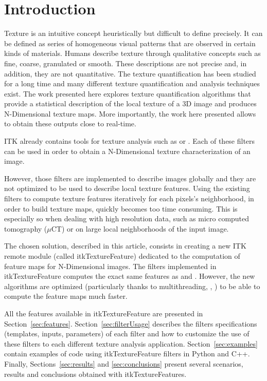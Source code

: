 \documentclass{InsightArticle}
\newcommand{\IJhandlerIDnumber}{3574}
\begin{document}
\IJhandlenote{\IJhandlerIDnumber}
\newpage
\tableofcontents
\newpage
\section{Introduction}
\label{sec:intro}

Texture is an intuitive concept heuristically but difficult to define
precisely. It can be defined as series of homogeneous visual patterns that are
observed in certain kinds of materials. Humans describe texture through
qualitative concepts such as fine, coarse, granulated or smooth. These
descriptions are not precise and, in addition, they are not quantitative. The
texture quantification has been studied for a long time and many different texture quantification and analysis techniques exist. The work presented here explores texture quantification algorithms that provide a statistical description of the local texture of a 3D image and produces N-Dimensional texture maps. More importantly, the work here presented allows to obtain these outputs close to real-time.

ITK already contains tools for texture analysis such as
 or
. Each of these filters can be
used in order to obtain a N-Dimensional texture characterization of an image.

However, those filters are implemented to describe images globally and they
are not optimized to be used to describe local texture features. Using the
existing filters to compute texture features iteratively for each pixels's
neighborhood, in order to build texture maps, quickly becomes too time
consuming. This is especially so when dealing with high resolution data, such
as micro computed tomography ($\mu$CT) or on large local neighborhoods of the input image.

The chosen solution, described in this article, consists in creating a new ITK
remote module (called itkTextureFeature) dedicated to the computation of feature maps
for N-Dimensional images. The filters implemented in itkTextureFeature
computes the exact same features as  and . However, the new algorithms are optimized (particularly thanks to multithreading, , ) to be able to compute the feature maps much faster.

All the features available in itkTextureFeature are presented in
Section~\ref{sec:features}. Section~\ref{sec:filterUsage} describes the
filters specifications (templates, inputs, parameters) of each filter and how
to customize the use of these filters to each different texture analysis
application. Section~\ref{sec:examples} contain examples of code using
itkTextureFeature filters in Python and C++. Finally,
Sections~\ref{sec:results} and \ref{sec:conclusions} present several
scenarios, results and conclusions obtained with itkTextureFeatures.
\newpage
\end{document}

